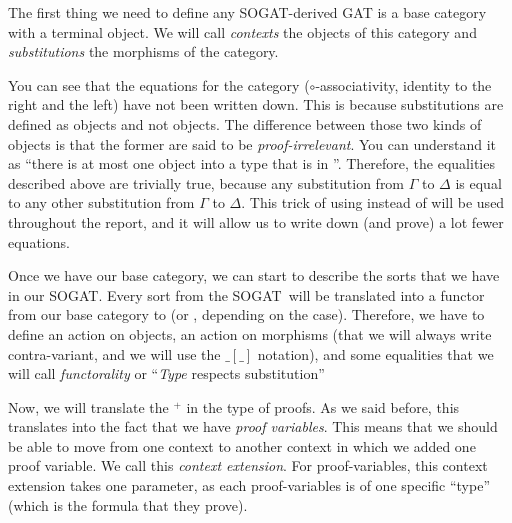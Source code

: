 \documentclass[10pt,a4paper]{article}
\begin{document}
			The first thing we need to define any SOGAT-derived GAT is a base category with a terminal object. We will call \emph{contexts} the objects of this category and \emph{substitutions} the morphisms of the category.
			
			You can see that the equations for the category ($\circ$-associativity, identity to the right and the left) have not been written down. This is because substitutions are defined as \Prop{} objects and not \Set{} objects. The difference between those two kinds of objects is that the former are said to be \emph{proof-irrelevant}. You can understand it as \enquote{there is at most one object into a type that is in \Prop}. Therefore, the equalities described above are trivially true, because any substitution from $\Gamma$ to $\Delta$ is equal to any other substitution from $\Gamma$ to $\Delta$. This trick of using \Prop{} instead of \Set{} will be used throughout the report, and it will allow us to write down (and prove) a lot fewer equations.
			
			\begin{tcolorbox}
			\end{tcolorbox}
		
			Once we have our base category, we can start to describe the sorts that we have in our SOGAT. Every sort from the SOGAT will be translated into a functor from our base category to \Set{} (or \Prop{}, depending on the case). Therefore, we have to define an action on objects, an action on morphisms (that we will always write contra-variant, and we will use the $\_[\_]$ notation), and some equalities that we will call \emph{functorality} or \enquote{\textit{Type} respects substitution}
			
			\begin{tcolorbox}
				\agda{agda/ZOL-3.tex}
				\agdasep
				\agda{agda/ZOL-4.tex}
			\end{tcolorbox}
		
			Now, we will translate the ${}^+$ in the type of proofs. As we said before, this translates into the fact that we have \emph{proof variables}. This means that we should be able to move from one context to another context in which we added one proof variable. We call this \emph{context extension}. For proof-variables, this context extension takes one parameter, as each proof-variables is of one specific \enquote{type} (which is the formula that they prove).
			
\end{document}
